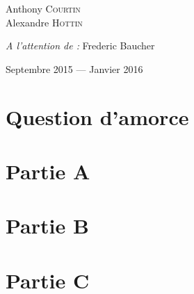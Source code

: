 \documentclass[12pt, openany]{report}
\begin{document}
\begin{titlepage}
\begin{sffamily}
\begin{center}
    \begin{minipage}{0.4\textwidth}
      \begin{flushleft} \large
        Anthony \textsc{Courtin}\\
        Alexandre \textsc{Hottin}\\
      \end{flushleft}
    \end{minipage}
    \begin{minipage}{0.4\textwidth}
      \begin{flushright} \large
        \emph{A l'attention de :} Frederic Baucher \\
      \end{flushright}
    \end{minipage}

    \vfill

    {\large Septembre 2015 — Janvier 2016}

  \end{center}
  \end{sffamily}
\end{titlepage}

\tableofcontents{}
\newpage

\chapter{Question d'amorce}


\chapter{Partie A}


\chapter{Partie B}


\chapter{Partie C}


% 

% 

% 

% 

\listoffigures
\end{document}
